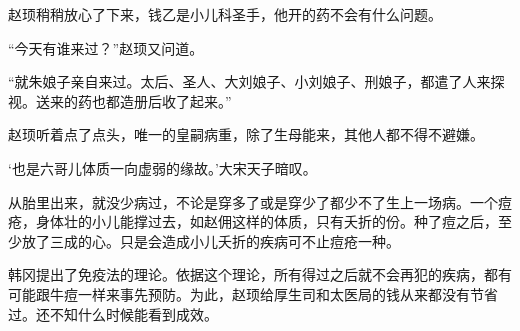 赵顼稍稍放心了下来，钱乙是小儿科圣手，他开的药不会有什么问题。 

“今天有谁来过？”赵顼又问道。 

“就朱娘子亲自来过。太后、圣人、大刘娘子、小刘娘子、刑娘子，都遣了人来探视。送来的药也都造册后收了起来。” 

赵顼听着点了点头，唯一的皇嗣病重，除了生母能来，其他人都不得不避嫌。 

‘也是六哥儿体质一向虚弱的缘故。’大宋天子暗叹。 

从胎里出来，就没少病过，不论是穿多了或是穿少了都少不了生上一场病。一个痘疮，身体壮的小儿能撑过去，如赵佣这样的体质，只有夭折的份。种了痘之后，至少放了三成的心。只是会造成小儿夭折的疾病可不止痘疮一种。 

韩冈提出了免疫法的理论。依据这个理论，所有得过之后就不会再犯的疾病，都有可能跟牛痘一样来事先预防。为此，赵顼给厚生司和太医局的钱从来都没有节省过。还不知什么时候能看到成效。 
